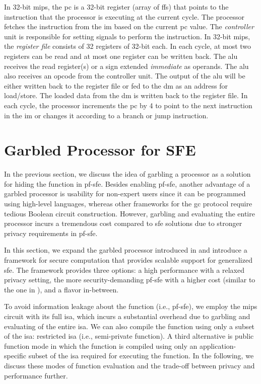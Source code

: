 In 32-bit \gls{mips}, the \acrfull{pc} is a 32-bit register (array of \acrshort{ff}s) that points to the instruction that the processor is executing at the current cycle.
The processor fetches the instruction from the \acrshort{im} based on the current \acrshort{pc} value.
The \emph{controller} unit is responsible for setting signals to perform the instruction.
In 32-bit \gls{mips}, the \emph{register file} consists of 32 registers of 32-bit each.
In each cycle, at most two registers can be read and at most one register can be written back.
The \acrshort{alu} receives the read register(s) or a sign extended \textit{immediate} as operands.
The \acrshort{alu} also receives an opcode from the controller unit.
The output of the \acrshort{alu} will be either written back to the register file or fed to the \acrshort{dm} as an address for load/store.
The loaded data from the \acrshort{dm} is written back to the register file.
In each cycle, the processor increments the \acrshort{pc} by 4 to point to the next instruction in the \acrshort{im} or changes it according to a branch or jump instruction.

\section{Garbled Processor for SFE}\label{sec:processor-mips-sfe}
In the previous section, we discuss the idea of garbling a processor as a solution for hiding the function in \acrshort{pf-sfe}.
Besides enabling \acrshort{pf-sfe}, another advantage of a garbled processor is usability for non-expert users since it can be programmed using high-level languages, whereas other frameworks for the \acrshort{gc} protocol require tedious Boolean circuit construction.
However, garbling and evaluating the entire processor incurs a tremendous cost compared to \acrshort{sfe} solutions due to stronger privacy requirements in \acrshort{pf-sfe}.

In this section, we expand the garbled processor introduced in  and introduce a framework for secure computation that provides scalable support for generalized \acrshort{sfe}.
The framework provides three options: a high performance with a relaxed privacy setting, the more security-demanding \acrshort{pf-sfe} with a higher cost (similar to the one in ), and a flavor in-between.

To avoid information leakage about the function (i.e., \acrshort{pf-sfe}), we employ the \gls{mips} circuit with its full \acrfull{isa}, which incurs a substantial overhead due to garbling and evaluating of the entire \acrshort{isa}.
We can also compile the function using only a subset of the \acrshort{isa}: restricted \acrshort{isa} (i.e., semi-private function).
A third alternative is public function mode in which the function is compiled using only an application-specific subset of the \acrshort{isa} required for executing the function.
In the following, we discuss these modes of function evaluation and the trade-off between privacy and performance further.

